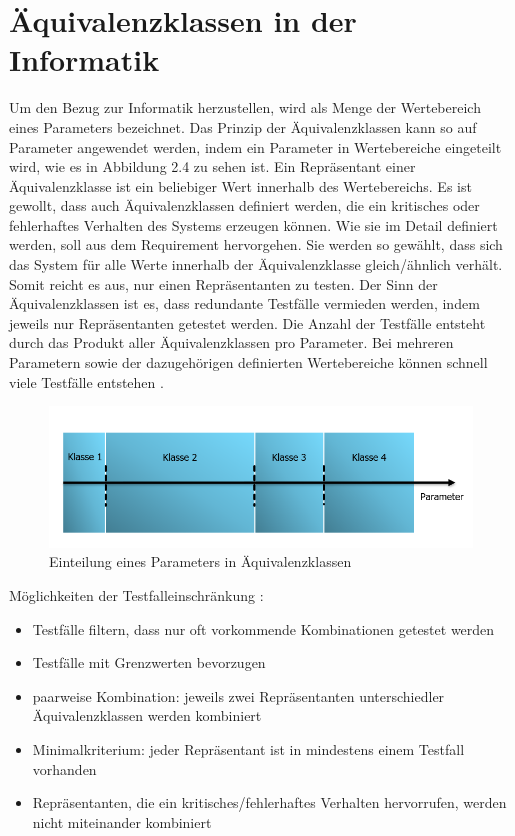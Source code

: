 \section*{Äquivalenzklassen in der Informatik}
Um den Bezug zur Informatik herzustellen, wird als Menge der Wertebereich eines Parameters bezeichnet.
Das Prinzip der Äquivalenzklassen kann so auf Parameter angewendet werden, indem ein Parameter in Wertebereiche eingeteilt wird, wie es in Abbildung 2.4 zu sehen ist.
Ein Repräsentant einer Äquivalenzklasse ist ein beliebiger Wert innerhalb des Wertebereichs. 
Es ist gewollt, dass auch Äquivalenzklassen definiert werden, die ein kritisches oder fehlerhaftes Verhalten des Systems erzeugen können.
Wie sie im Detail definiert werden, soll aus dem Requirement hervorgehen.
Sie werden so gewählt, dass sich das System für alle Werte innerhalb der Äquivalenzklasse gleich/ähnlich verhält. Somit reicht es aus, nur 
einen Repräsentanten zu testen. 
Der Sinn der Äquivalenzklassen ist es, dass redundante Testfälle vermieden werden, indem jeweils nur Repräsentanten getestet werden.
Die Anzahl der Testfälle entsteht durch das Produkt aller Äquivalenzklassen pro Parameter. Bei mehreren Parametern sowie der dazugehörigen definierten Wertebereiche
können schnell viele Testfälle entstehen \parencite[S. 114 ff.]{equiinformatic}.\par
\begin{figure}[h]
\centering
\includegraphics[scale=1.2,]{Bilder/EquiZeitstrahl/ZeitstrahlVerschiedeneKlassenParameter.png} %
\caption{Einteilung eines Parameters in Äquivalenzklassen \parencite[S. 114 ff.]{equiinformatic}}
\end{figure}
Möglichkeiten der Testfalleinschränkung \parencite[S. 120]{equiinformatic}:
\begin{itemize}
\item Testfälle filtern, dass nur oft vorkommende Kombinationen getestet werden
\item Testfälle mit Grenzwerten bevorzugen
\item paarweise Kombination: jeweils zwei Repräsentanten unterschiedler Äquivalenzklassen werden kombiniert
\item Minimalkriterium: jeder Repräsentant ist in mindestens einem Testfall vorhanden
\item Repräsentanten, die ein kritisches/fehlerhaftes Verhalten hervorrufen, werden nicht miteinander kombiniert
\end{itemize}

